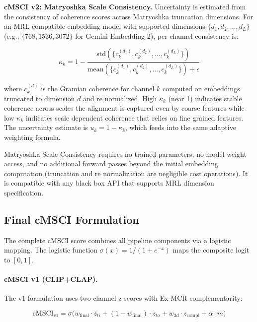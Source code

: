 \documentclass[a4paper,fleqn]{cas-sc}
\begin{document}
\begin{itemize}
\textbf{cMSCI v2: Matryoshka Scale Consistency.} Uncertainty is estimated from the consistency of coherence scores across Matryoshka truncation dimensions. For an MRL-compatible embedding model with supported dimensions $\{d_1, d_2, \ldots, d_L\}$ (e.g., $\{768, 1536, 3072\}$ for Gemini Embedding 2), per channel consistency is:

\begin{equation}\label{eq:matryoshka-consistency}
\kappa_k = 1 - \frac{\mathrm{std}(\{c_k^{(d_1)}, c_k^{(d_2)}, \ldots, c_k^{(d_L)}\})}{\mathrm{mean}(\{c_k^{(d_1)}, c_k^{(d_2)}, \ldots, c_k^{(d_L)}\}) + \epsilon}
\end{equation}

where $c_k^{(d)}$ is the Gramian coherence for channel $k$ computed on embeddings truncated to dimension $d$ and re normalized. High $\kappa_k$ (near 1) indicates stable coherence across scales the alignment is captured even by coarse features while low $\kappa_k$ indicates scale dependent coherence that relies on fine grained features. The uncertainty estimate is $u_k = 1 - \kappa_k$, which feeds into the same adaptive weighting formula.

Matryoshka Scale Consistency requires no trained parameters, no model weight access, and no additional forward passes beyond the initial embedding computation (truncation and re normalization are negligible cost operations). It is compatible with any black box API that supports MRL dimension specification.



\subsection{Final cMSCI Formulation}\label{sec:final-formulation}

The complete cMSCI score combines all pipeline components via a logistic mapping. The logistic function $\sigma(x) = 1/(1 + e^{-x})$ maps the composite logit to $[0, 1]$.

\paragraph{cMSCI v1 (CLIP+CLAP).} The v1 formulation uses two-channel z-scores with Ex-MCR complementarity:

\begin{equation}\label{eq:cmsci-v1}
\mathrm{cMSCI}_{v1} = \sigma\!\Big(w_{\mathrm{final}} \cdot z_{ti} + (1 - w_{\mathrm{final}}) \cdot z_{ta} + w_{3d} \cdot z_{\mathrm{compl}} + \alpha \cdot m\Big)
\end{equation}


\end{itemize}
\end{document}
